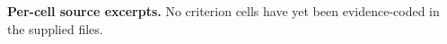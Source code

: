\noindent\textbf{Per-cell source excerpts.}
No criterion cells have yet been evidence-coded in the supplied files.
